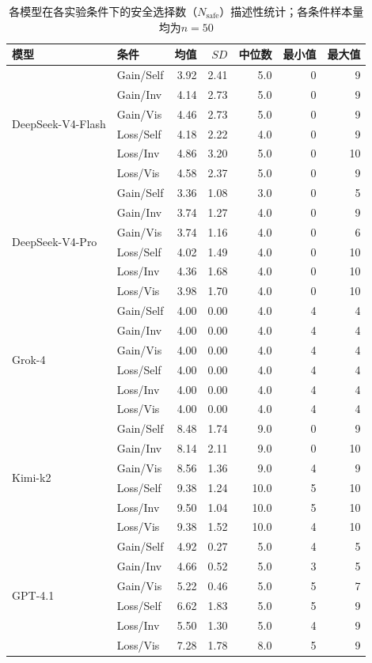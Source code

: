 \begin{table}[tb]
  \caption{各模型在各实验条件下的安全选择数（$N_{\text{safe}}$）描述性统计；各条件样本量均为$n=50$}
  \label{tab:descriptive}
  \centering
  \scriptsize
  \setlength{\tabcolsep}{2.2pt}
  \begin{tabular}{llrrrrr}
    \toprule
    模型 & 条件 & 均值 & $SD$ & 中位数 & 最小值 & 最大值 \\
    \midrule
    \multirow{6}{*}{DeepSeek-V4-Flash} & Gain/Self & 3.92 & 2.41 & 5.0 & 0 & 9 \\
     & Gain/Inv & 4.14 & 2.73 & 5.0 & 0 & 9 \\
     & Gain/Vis & 4.46 & 2.73 & 5.0 & 0 & 9 \\
     & Loss/Self & 4.18 & 2.22 & 4.0 & 0 & 9 \\
     & Loss/Inv & 4.86 & 3.20 & 5.0 & 0 & 10 \\
     & Loss/Vis & 4.58 & 2.37 & 5.0 & 0 & 9 \\
    \multirow{6}{*}{DeepSeek-V4-Pro} & Gain/Self & 3.36 & 1.08 & 3.0 & 0 & 5 \\
     & Gain/Inv & 3.74 & 1.27 & 4.0 & 0 & 9 \\
     & Gain/Vis & 3.74 & 1.16 & 4.0 & 0 & 6 \\
     & Loss/Self & 4.02 & 1.49 & 4.0 & 0 & 10 \\
     & Loss/Inv & 4.36 & 1.68 & 4.0 & 0 & 10 \\
     & Loss/Vis & 3.98 & 1.70 & 4.0 & 0 & 10 \\
    \multirow{6}{*}{Grok-4} & Gain/Self & 4.00 & 0.00 & 4.0 & 4 & 4 \\
     & Gain/Inv & 4.00 & 0.00 & 4.0 & 4 & 4 \\
     & Gain/Vis & 4.00 & 0.00 & 4.0 & 4 & 4 \\
     & Loss/Self & 4.00 & 0.00 & 4.0 & 4 & 4 \\
     & Loss/Inv & 4.00 & 0.00 & 4.0 & 4 & 4 \\
     & Loss/Vis & 4.00 & 0.00 & 4.0 & 4 & 4 \\
    \multirow{6}{*}{Kimi-k2} & Gain/Self & 8.48 & 1.74 & 9.0 & 0 & 9 \\
     & Gain/Inv & 8.14 & 2.11 & 9.0 & 0 & 10 \\
     & Gain/Vis & 8.56 & 1.36 & 9.0 & 4 & 9 \\
     & Loss/Self & 9.38 & 1.24 & 10.0 & 5 & 10 \\
     & Loss/Inv & 9.50 & 1.04 & 10.0 & 5 & 10 \\
     & Loss/Vis & 9.38 & 1.52 & 10.0 & 4 & 10 \\
    \multirow{6}{*}{GPT-4.1} & Gain/Self & 4.92 & 0.27 & 5.0 & 4 & 5 \\
     & Gain/Inv & 4.66 & 0.52 & 5.0 & 3 & 5 \\
     & Gain/Vis & 5.22 & 0.46 & 5.0 & 5 & 7 \\
     & Loss/Self & 6.62 & 1.83 & 5.0 & 5 & 9 \\
     & Loss/Inv & 5.50 & 1.30 & 5.0 & 4 & 9 \\
     & Loss/Vis & 7.28 & 1.78 & 8.0 & 5 & 9 \\
    \bottomrule
  \end{tabular}
\end{table}

